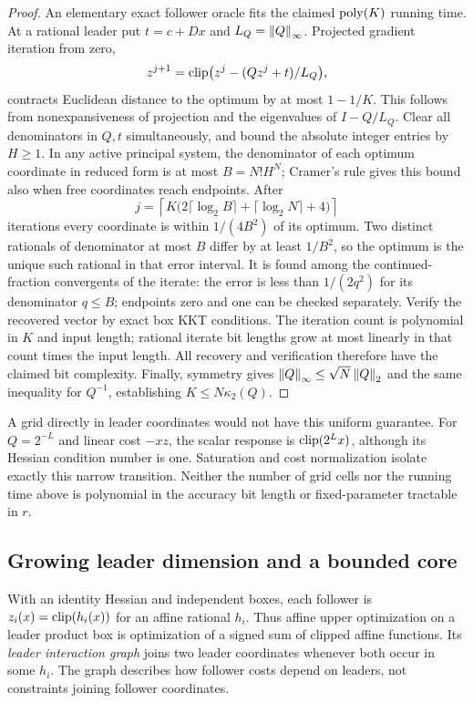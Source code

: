 \begin{proof}
An elementary exact follower oracle fits the claimed \(\operatorname{poly}(K)\) running
time. At a rational leader put \(t=c+Dx\) and
\(L_Q=\left\lVert Q\right\rVert_\infty\). Projected gradient iteration from zero,
\[
 z^{j+1}=\operatorname{clip}\bigl(z^j-(Qz^j+t)/L_Q\bigr),
\]
contracts Euclidean distance to the optimum by at most \(1-1/K\). This follows
from nonexpansiveness of projection and the eigenvalues of \(I-Q/L_Q\).
Clear all denominators in \(Q,t\) simultaneously, and bound the absolute
integer entries by \(H\ge1\). In any active principal system, the denominator
of each optimum coordinate in reduced form is at most \(B=N!H^N\);
Cramer's rule gives this bound also when free coordinates reach endpoints.
After
\[
 j=\left\lceil K\bigl(2\lceil\log_2B\rceil+
               \lceil\log_2N\rceil+4\bigr)\right\rceil
\]
iterations every coordinate is within \(1/(4B^2)\) of its optimum. Two distinct
rationals of denominator at most \(B\) differ by at least \(1/B^2\), so the
optimum is the unique such rational in that error interval. It is found among
the continued-fraction convergents of the iterate: the error is less than
\(1/(2q^2)\) for its denominator \(q\le B\); endpoints zero and one can be
checked separately. Verify the recovered vector by exact box KKT conditions.
The iteration count is polynomial in \(K\) and input length; rational iterate
bit lengths grow at most linearly in that count times the input length.
All recovery and verification therefore have the claimed bit complexity.
Finally, symmetry gives \(\left\lVert Q\right\rVert_\infty\le\sqrt N\left\lVert Q\right\rVert_2\) and the same
inequality for \(Q^{-1}\), establishing \(K\le N\kappa_2(Q)\).
\end{proof}
A grid directly in leader coordinates would not have this uniform guarantee.
For \(Q=2^{-L}\) and linear cost \(-xz\), the scalar response is
\(\operatorname{clip}(2^Lx)\), although its Hessian condition number is one. Saturation and
cost normalization isolate exactly this narrow transition. Neither the number
of grid cells nor the running time above is polynomial in the accuracy bit
length or fixed-parameter tractable in \(r\).

\subsection{Growing leader dimension and a bounded core}
\label{subsec:leader-structure}
With an identity Hessian and independent boxes, each follower is
\(z_i(x)=\operatorname{clip}(h_i(x))\) for an affine rational \(h_i\). Thus affine upper
optimization on a leader product box is optimization of a signed sum of
clipped affine functions. Its \emph{leader interaction graph} joins two leader
coordinates whenever both occur in some \(h_i\). The graph describes how
follower costs depend on leaders, not constraints joining follower
coordinates.


